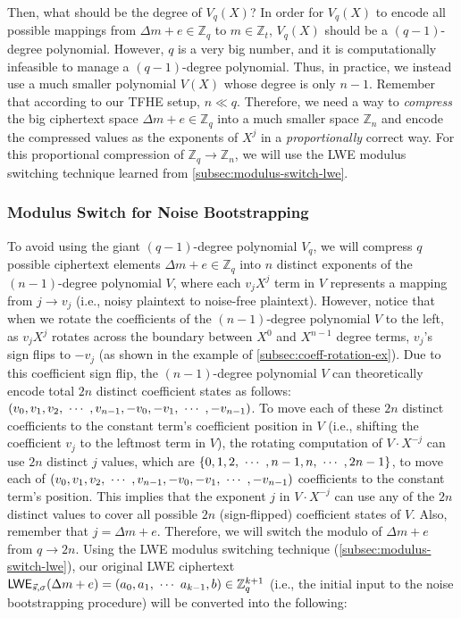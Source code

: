 Then, what should be the degree of $V_q(X)$? In order for $V_q(X)$ to encode all possible mappings from $\Delta m + e \in \mathbb{Z}_q$ to $m \in \mathbb{Z}_t$, $V_q(X)$ should be a $(q-1)$-degree polynomial. However, $q$ is a very big number, and it is computationally infeasible to manage a $(q-1)$-degree polynomial. Thus, in practice, we instead use a much smaller polynomial $V(X)$ whose degree is only $n-1$. Remember that according to our TFHE setup, $n \ll q$. Therefore, we need a way to \textit{compress} the big ciphertext space $\Delta m + e \in \mathbb{Z}_q$ into a much smaller space $\mathbb{Z}_n$ and encode the compressed values as the exponents of $X^j$ in a \textit{proportionally} correct way. For this proportional compression of $\mathbb{Z}_q \rightarrow \mathbb{Z}_n$, we will use the LWE modulus switching technique learned from \autoref{subsec:modulus-switch-lwe}. 

\subsubsection{Modulus Switch for Noise Bootstrapping}
\label{subsec:bootstrapping-modulus-switch}

To avoid using the giant $(q-1)$-degree polynomial $V_q$, we will compress $q$ possible ciphertext elements $\Delta m + e \in \mathbb{Z}_q$ into $n$ distinct exponents of the $(n-1)$-degree polynomial $V$, where each $v_jX^j$ term in $V$ represents a mapping from $j \rightarrow v_j$ (i.e., noisy plaintext to noise-free plaintext). However, notice that when we rotate the coefficients of the $(n-1)$-degree polynomial $V$ to the left, as $v_jX^j$ rotates across the boundary between $X^0$ and $X^{n-1}$ degree terms, $v_j$'s sign flips to $-v_j$ (as shown in the example of \autoref{subsec:coeff-rotation-ex}). Due to this coefficient sign flip, the $(n-1)$-degree polynomial $V$ can theoretically encode total $2n$ distinct coefficient states as follows: $(v_0, v_1, v_2, \text{ } \text{$\cdots$} \text{ }, v_{n-1}, -v_0, -v_1, \text{ } \text{$\cdots$} \text{ }, -v_{n-1})$. To move each of these $2n$ distinct coefficients to the constant term's coefficient position in $V$ (i.e., shifting the coefficient $v_j$ to the leftmost term in $V$), the rotating computation of $V \cdot X^{-j}$ can use $2n$ distinct $j$ values, which are $\{0, 1, 2, \text{ } \text{$\cdots$} \text{ }, n-1, n, \text{ } \text{$\cdots$} \text{ }, 2n-1\}$, to move each of $(v_0, v_1, v_2, \text{ } \text{$\cdots$} \text{ }, v_{n-1}, -v_0, -v_1, \text{ } \text{$\cdots$} \text{ }, -v_{n-1})$ coefficients to the constant term's position. This implies that the exponent $j$ in $V\cdot X^{-j}$ can use any of the $2n$ distinct values to cover all possible $2n$ (sign-flipped) coefficient states of $V$. Also, remember that $j = \Delta m + e$.  Therefore, we will switch the modulo of $\Delta m + e$ from $q \rightarrow 2n$. Using the LWE modulus switching technique (\autoref{subsec:modulus-switch-lwe}), our original LWE ciphertext $\textsf{LWE}_{\vec{s}, \sigma}(\Delta m + e) = ({a}_0, {a}_1, \text{ } \text{$\cdots$} \text{ } {a}_{k-1}, {b}) \in \mathbb{Z}_q^{k+1}$ (i.e., the initial input to the noise bootstrapping procedure) will be converted into the following: 

